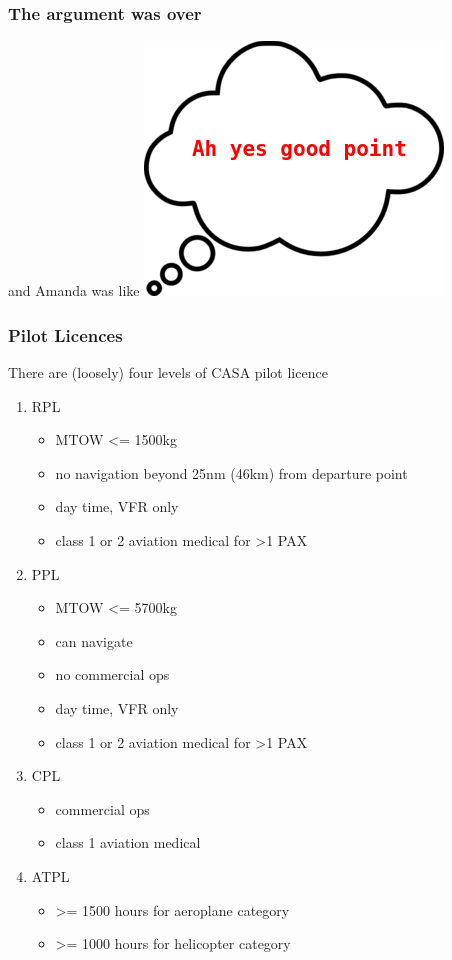 \begin{frame}
\frametitle{The argument was over}
\begin{block}{and Amanda was like}
\includegraphics[height=0.5\textheight]{image/thought-bubble-good-point.png}
\end{block}
\end{frame}

\begin{frame}
\frametitle{Pilot Licences}
\begin{block}{There are (loosely) four levels of CASA pilot licence}
\begin{enumerate}
\item RPL
  \begin{itemize}
  \item \tiny{MTOW <= 1500kg}
  \item \tiny{no navigation beyond 25nm (46km) from departure point}
  \item \tiny{day time, VFR only}
  \item \tiny{class 1 or 2 aviation medical for >1 PAX}
  \end{itemize}
\item PPL
  \begin{itemize}
  \item \tiny{MTOW <= 5700kg}
  \item \tiny{can navigate}
  \item \tiny{no commercial ops}
  \item \tiny{day time, VFR only}
  \item \tiny{class 1 or 2 aviation medical for >1 PAX}
  \end{itemize}
\item CPL
  \begin{itemize}
  \item \tiny{commercial ops}
  \item \tiny{class 1 aviation medical}
  \end{itemize}
\item ATPL
  \begin{itemize}
  \item \tiny{>= 1500 hours for aeroplane category}
  \item \tiny{>= 1000 hours for helicopter category}
  \end{itemize}
\end{enumerate}
\end{block}
\end{frame}

